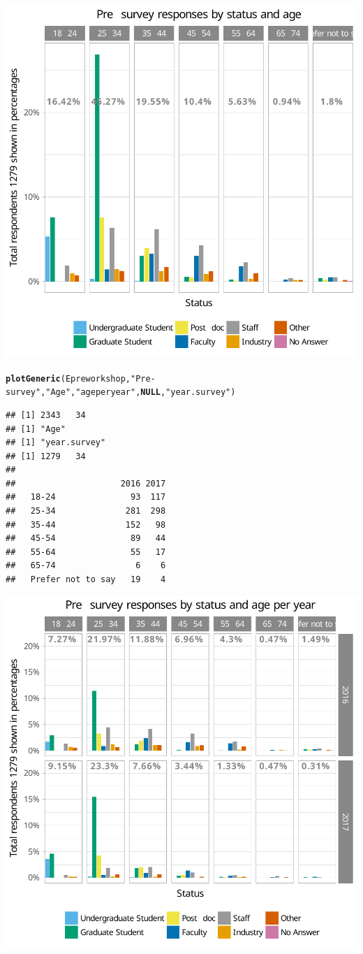 \documentclass{article}\usepackage[]{graphicx}\usepackage[]{color}
\makeatletter
\newcommand{\hlstr}[1]{\textcolor[rgb]{0.192,0.494,0.8}{#1}}%
\newcommand{\hlstd}[1]{\textcolor[rgb]{0.345,0.345,0.345}{#1}}%
\newcommand{\hlkwa}[1]{\textcolor[rgb]{0.161,0.373,0.58}{\textbf{#1}}}%
\newcommand{\hlkwd}[1]{\textcolor[rgb]{0.737,0.353,0.396}{\textbf{#1}}}%
\newenvironment{kframe}{%
 \def\at@end@of@kframe{}%
 \ifinner\ifhmode%
  \def\at@end@of@kframe{\end{minipage}}%
  \begin{minipage}{\columnwidth}%
 \fi\fi%
 \def\FrameCommand##1{\hskip\@totalleftmargin \hskip-\fboxsep
 \colorbox{shadecolor}{##1}\hskip-\fboxsep
     \hskip-\linewidth \hskip-\@totalleftmargin \hskip\columnwidth}%
 \MakeFramed {\advance\hsize-\width
   \@totalleftmargin\z@ \linewidth\hsize
   \@setminipage}}%
 {\par\unskip\endMakeFramed%
 \at@end@of@kframe}
\newenvironment{knitrout}{}{} %
\makeatother
\begin{document}
\begin{knitrout}
{\centering \includegraphics[width=.6\linewidth]{figure/calls-Rnwplotting-presurvey-data-11} 

}


\begin{kframe}\begin{alltt}
\hlkwd{plotGeneric}\hlstd{(Epreworkshop,} \hlstr{"Pre-survey"}\hlstd{,} \hlstr{"Age"} \hlstd{,} \hlstr{"age per year"}\hlstd{,}\hlkwa{NULL}\hlstd{,} \hlstr{"year.survey"}\hlstd{)}
\end{alltt}
\begin{verbatim}
## [1] 2343   34
## [1] "Age"
## [1] "year.survey"
## [1] 1279   34
##                    
##                     2016 2017
##   18-24               93  117
##   25-34              281  298
##   35-44              152   98
##   45-54               89   44
##   55-64               55   17
##   65-74                6    6
##   Prefer not to say   19    4
\end{verbatim}
\end{kframe}

{\centering \includegraphics[width=.6\linewidth]{figure/calls-Rnwplotting-presurvey-data-12} 

}
\end{knitrout}
\end{document}
